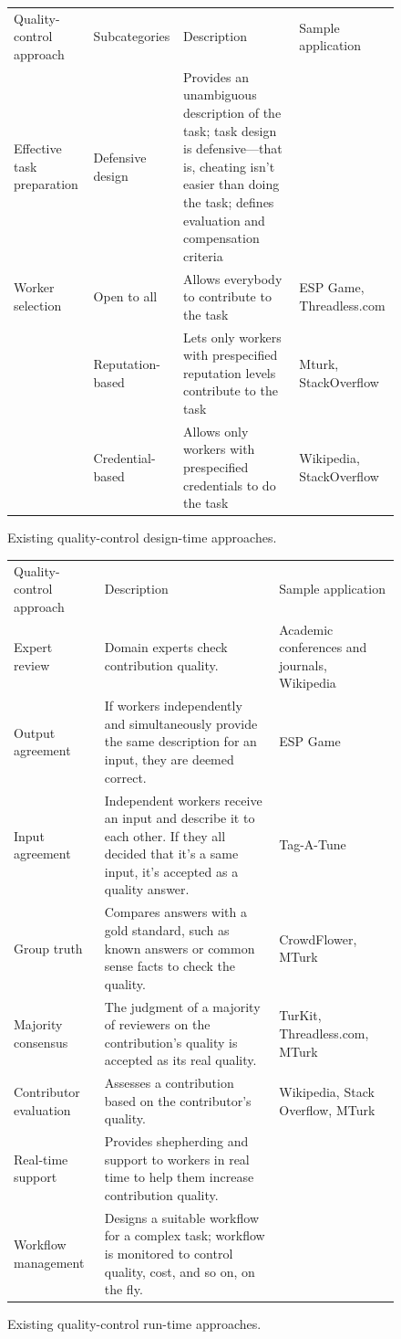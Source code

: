 \documentclass[9pt,twocolumn]{article}
\begin{document}
	
	\begin{figure}
	\begin{tabularx}{\textwidth}{|XlXl|}
		\hline
		Quality-control approach & Subcategories & Description & Sample application\\
		Effective task preparation & Defensive design & Provides an unambiguous description of the task; task design is defensive---that is, cheating isn't easier than doing the task; defines evaluation and compensation criteria &  \\
		Worker selection & Open to all & Allows everybody to contribute to the task & ESP Game, Threadless.com \\
										  & Reputation-based & Lets only workers with prespecified reputation levels contribute to the task & Mturk, StackOverflow \\
										  & Credential-based & Allows only workers with prespecified credentials to do the task & Wikipedia, StackOverflow \\ \hline
	\end{tabularx}
	\caption{Existing quality-control design-time approaches.} %
	\label{fig-tbl1}
	\end{figure}
	
	\begin{figure}[!ht]

		\begin{tabularx}{1.1\textwidth}{|lXX|}
			\hline
			Quality-control approach & Description & Sample application \\
			Expert review & Domain experts check contribution quality. & Academic conferences and journals, Wikipedia \\
			Output agreement 		& If workers independently and simultaneously provide the same description for an input, they are deemed correct. & ESP Game \\
			Input agreement 		& Independent workers receive an input and describe it to each other.
			If they all decided that it's a same input, it's accepted as a quality answer. & Tag-A-Tune \\
			Group truth 			& Compares answers with a gold standard, such as known answers or common sense facts to check the quality. & CrowdFlower, MTurk \\
			Majority consensus 		& The judgment of a majority of reviewers on the contribution's quality is accepted as its real quality. & TurKit, Threadless.com, MTurk \\
			Contributor evaluation 	& Assesses a contribution based on the contributor's quality. & Wikipedia, Stack Overflow, MTurk \\
			Real-time support 		& Provides shepherding and support to workers in real time to help them increase contribution quality. & \\
			Workflow management 	& Designs a suitable workflow for a complex task; workflow is monitored to control quality, cost, and so on, on the fly. & \\
			 \hline
		\end{tabularx}
	\caption{Existing quality-control run-time approaches.}
	\label{fig-tbl2}
	\end{figure}
	
\end{document}
